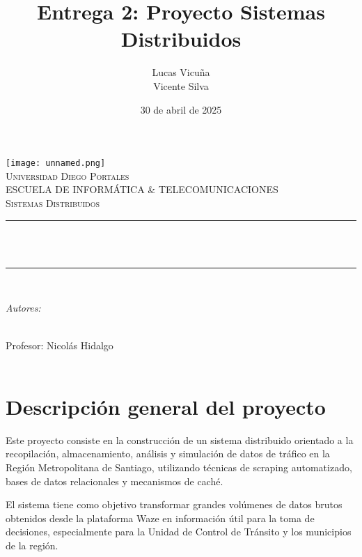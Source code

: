 \documentclass[12pt]{article}
\title{Entrega 2:  Proyecto Sistemas Distribuidos}
\author{
    Lucas Vicuña \\
    Vicente Silva\\
}
\date{30 de abril de 2025}
\makeatletter
\newcommand{\profesor}{Profesor: Nicolás Hidalgo}
\let\thetitle\@title
\let\theauthor\@author
\let\thedate\@date
\makeatother
\begin{document}
\begin{titlepage}
	\centering
    \vspace*{0.0 cm}
    \texttt{[image: unnamed.png]}\\[1.0 cm]
    
    \textsc{\LARGE Universidad Diego Portales}\\[0.2 cm]
	\textsc{\large ESCUELA DE INFORMÁTICA \& TELECOMUNICACIONES}\\[2 cm]
	\textsc{\LARGE Sistemas Distribuidos}\\[1.0 cm]
	
	\rule{\linewidth}{0.2 mm} \\[0.4 cm]
	{\huge \bfseries \thetitle}\\
	\rule{\linewidth}{0.2 mm} \\[1.5 cm]
	
	\begin{minipage}{0.9\textwidth}
		\begin{center} \large
			\emph{Autores:} \\
			\theauthor
		\end{center}
	\end{minipage}\\[0.8 cm]
	
	{\large \profesor}\\[0.8 cm]
	{\large \thedate}\\[1 cm]
\end{titlepage}

\pagebreak
\tableofcontents
\pagebreak


\section{Descripción general del proyecto}

Este proyecto consiste en la construcción de un sistema distribuido orientado a la recopilación, almacenamiento, análisis y simulación de datos de tráfico en la Región Metropolitana de Santiago, utilizando técnicas de scraping automatizado, bases de datos relacionales y mecanismos de caché. 

El sistema tiene como objetivo transformar grandes volúmenes de datos brutos obtenidos desde la plataforma Waze en información útil para la toma de decisiones, especialmente para la Unidad de Control de Tránsito y los municipios de la región.
\end{document}
